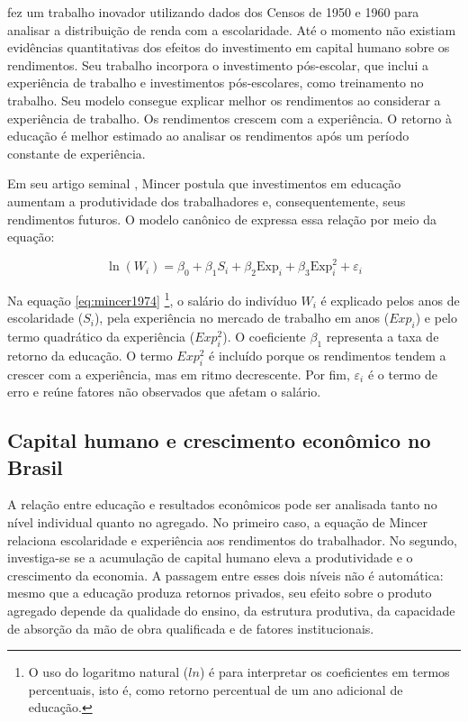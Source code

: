 \documentclass[
	12pt,				%
	openright,			%
	oneside,			%
	a4paper,			%
	brazil,				%
	]{article}
\begin{document}
\textcite{mincer1974} fez um trabalho inovador utilizando dados dos Censos de
1950 e 1960 para analisar a distribuição de renda com a escolaridade. Até o
momento não existiam evidências quantitativas dos efeitos do investimento em
capital humano sobre os rendimentos. Seu trabalho incorpora o investimento
pós-escolar, que inclui a experiência de trabalho e investimentos pós-escolares, como
treinamento no trabalho. Seu modelo consegue explicar melhor os rendimentos
ao considerar a experiência de trabalho. Os rendimentos crescem com a
experiência. O retorno à educação é melhor estimado ao analisar os rendimentos
após um período constante de experiência.

Em seu artigo seminal , Mincer postula que investimentos
em educação aumentam a produtividade dos trabalhadores e, consequentemente,
seus rendimentos futuros. O modelo canônico de \textcite{mincer1974} expressa
essa relação por meio da equação:

\begin{equation} \label{eq:mincer1974}
\ln(W_i) = \beta_0 + \beta_1 S_i + \beta_2 \text{Exp}_i + \beta_3 \text{Exp}_i^2 + \varepsilon_i
\end{equation}

Na equação \ref{eq:mincer1974} \footnote{O uso do logaritmo natural ($ln$) é
para interpretar os coeficientes em termos percentuais, isto é, como retorno
percentual de um ano adicional de educação.}, o salário do indivíduo $W_i$ é
explicado pelos anos de escolaridade ($S_i$), pela experiência no mercado de
trabalho em anos ($Exp_i$) e pelo termo quadrático da experiência ($Exp_i^2$).
O coeficiente $\beta_1$ representa a taxa de retorno da educação. O termo
$Exp_i^2$ é incluído porque os rendimentos tendem a crescer com a experiência,
mas em ritmo decrescente. Por fim, $\varepsilon_i$ é o termo de erro e reúne
fatores não observados que afetam o salário.

\subsection{Capital humano e crescimento econômico no Brasil}

A relação entre educação e resultados econômicos pode ser analisada tanto no
nível individual quanto no agregado. No primeiro caso, a equação de Mincer
relaciona escolaridade e experiência aos rendimentos do trabalhador. No segundo,
investiga-se se a acumulação de capital humano eleva a produtividade e o
crescimento da economia. A passagem entre esses dois níveis não é automática:
mesmo que a educação produza retornos privados, seu efeito sobre o produto
agregado depende da qualidade do ensino, da estrutura produtiva, da capacidade
de absorção da mão de obra qualificada e de fatores institucionais.
\end{document}
